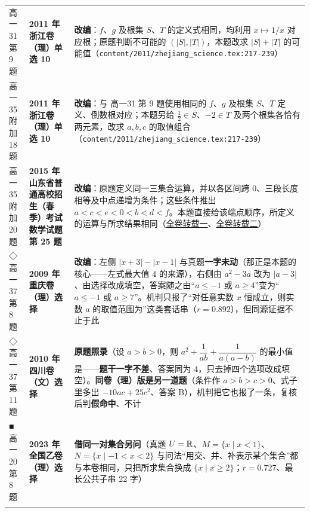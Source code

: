 \documentclass[a4paper,11pt]{article}
\begin{document}
\begin{xltabular}{\textwidth}{@{}>{\raggedright\arraybackslash}p{2.85cm}>{\raggedright\arraybackslash}p{3.99cm}>{\raggedright\arraybackslash}p{7.89cm}@{}}
高一31 第 9 题 & \textbf{2011 年浙江卷（理）单选 10} & \textbf{改编}：\(f\)、\(g\) 及根集 \(S\)、\(T\) 的定义式相同，均利用 \(x\mapsto1/x\) 对应根；原题判断不可能的 \((\lvert S\rvert,\allowbreak \lvert T\rvert)\)，本题改求 \(\lvert S\rvert+\allowbreak \lvert T\rvert\) 的可能值（\texttt{content/\allowbreak{}2011/\allowbreak{}zhejiang\_science.tex:217-\allowbreak{}239}） \\ \addlinespace[1pt]
高一35 附加 18 题 & \textbf{2011 年浙江卷（理）单选 10} & \textbf{改编}：与 高一31 第 9 题使用相同的 \(f\)、\(g\) 及根集 \(S\)、\(T\) 定义、倒数根对应；本题另给 \(\frac12\in S\)、\(-2\in T\) 及两个根集各恰有两元素，改求 \(a,b,c\) 的取值组合（\texttt{content/\allowbreak{}2011/\allowbreak{}zhejiang\_science.tex:217-\allowbreak{}239}） \\ \addlinespace[1pt]
高一35 附加 20 题 & \textbf{2015 年山东省普通高校招生（春季）考试数学试题第 25 题} & \textbf{改编}：原题定义同一三集合运算，并以各区间跨 0、三段长度相等及中点递增为条件；这些条件推出 \(a<c<e<0<b<d<f\)。本题直接给该端点顺序，所定义的运算与所求结果相同（\href{https://wenku.baidu.com/view/ae24a5fed6bbfd0a79563c1ec5da50e2534dd14e.html}{全卷转载一}、\href{https://wenku.baidu.com/view/eec989a467ce0508763231126edb6f1aff007192.html}{全卷转载二}） \\ \addlinespace[1pt]
◇高一37 第 8 题 & \textbf{2009 年重庆卷（理）选择} & \textbf{改编}：左侧 \(\lvert x+\allowbreak 3\rvert-\lvert x-1\rvert\) 与真题\textbf{一字未动}（那正是本题的核心------左式最大值 \(4\) 的来源），右侧由 \(a^2-3a\) 改为 \(\lvert a-3\rvert\)、由选择改成填空，答案随之由``\(a\leqslant\allowbreak -1\) 或 \(a\geqslant\allowbreak 4\)''变为``\(a\leqslant\allowbreak -1\) 或 \(a\geqslant\allowbreak 7\)''。机判只报了``对任意实数 \(x\) 恒成立，则实数 \(a\) 的取值范围为''这类套话串（\(r=\allowbreak 0.892\)），但同源证据不止于此 \\ \addlinespace[1pt]
◇高一37 第 11 题 & \textbf{2010 年四川卷（文）选择} & \textbf{原题照录}（设 \(a>b>0\)，则 \(a^2+\allowbreak \dfrac1{ab}+\allowbreak \dfrac1{a(a-b)}\) 的最小值是------\textbf{题干一字不差}、答案同为 \(4\)，只去掉四个选项改成填空）。\textbf{同卷（理）版是另一道题}（条件作 \(a>b>c>0\)、式子里多出 \(-10ac+\allowbreak 25c^2\)、答案 B），机判把它也报了一条，复核后判\textbf{假命中}、不计 \\ \addlinespace[1pt]
■高一20 第 8 题 & \textbf{2023 年全国乙卷（理）选择} & \textbf{借同一对集合另问}（真题 \(U=\allowbreak \mathbb{R}\)、\(M=\allowbreak \{x\mid\allowbreak  x<1\}\)、\(N=\allowbreak \{x\mid\allowbreak -1<x<2\}\) 与问法``用交、并、补表示某个集合''都与本卷相同，只把所求集合换成 \(\{x\mid\allowbreak  x\geqslant\allowbreak 2\}\)；\(r=\allowbreak 0.727\)、最长公共子串 22 字） \\ \addlinespace[1pt]

\end{xltabular}
\end{document}
